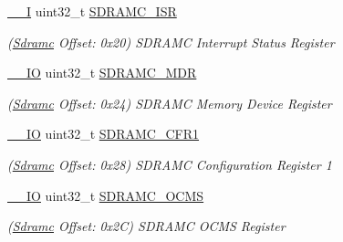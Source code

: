 \begin{DoxyCompactItemize}
\mbox{\label{structSdramc_a9ecf92e99d63d1d15fc8bf1386116e14}} 
\mbox{\hyperlink{core__cm7_8h_af63697ed9952cc71e1225efe205f6cd3}{\+\_\+\+\_\+I}} uint32\+\_\+t \mbox{\hyperlink{structSdramc_a9ecf92e99d63d1d15fc8bf1386116e14}{S\+D\+R\+A\+M\+C\+\_\+\+I\+SR}}
\begin{DoxyCompactList}\small\item\em (\mbox{\hyperlink{structSdramc}{Sdramc}} Offset\+: 0x20) S\+D\+R\+A\+MC Interrupt Status Register \end{DoxyCompactList}\item 
\mbox{\label{structSdramc_a87688d89689397e2bdbec196177c08c9}} 
\mbox{\hyperlink{core__cm7_8h_aec43007d9998a0a0e01faede4133d6be}{\+\_\+\+\_\+\+IO}} uint32\+\_\+t \mbox{\hyperlink{structSdramc_a87688d89689397e2bdbec196177c08c9}{S\+D\+R\+A\+M\+C\+\_\+\+M\+DR}}
\begin{DoxyCompactList}\small\item\em (\mbox{\hyperlink{structSdramc}{Sdramc}} Offset\+: 0x24) S\+D\+R\+A\+MC Memory Device Register \end{DoxyCompactList}\item 
\mbox{\label{structSdramc_ab4d0e677ef10512e2799b01c07c2c40e}} 
\mbox{\hyperlink{core__cm7_8h_aec43007d9998a0a0e01faede4133d6be}{\+\_\+\+\_\+\+IO}} uint32\+\_\+t \mbox{\hyperlink{structSdramc_ab4d0e677ef10512e2799b01c07c2c40e}{S\+D\+R\+A\+M\+C\+\_\+\+C\+F\+R1}}
\begin{DoxyCompactList}\small\item\em (\mbox{\hyperlink{structSdramc}{Sdramc}} Offset\+: 0x28) S\+D\+R\+A\+MC Configuration Register 1 \end{DoxyCompactList}\item 
\mbox{\label{structSdramc_a962d50372bb8acc1d7038967d1611e92}} 
\mbox{\hyperlink{core__cm7_8h_aec43007d9998a0a0e01faede4133d6be}{\+\_\+\+\_\+\+IO}} uint32\+\_\+t \mbox{\hyperlink{structSdramc_a962d50372bb8acc1d7038967d1611e92}{S\+D\+R\+A\+M\+C\+\_\+\+O\+C\+MS}}
\begin{DoxyCompactList}\small\item\em (\mbox{\hyperlink{structSdramc}{Sdramc}} Offset\+: 0x2C) S\+D\+R\+A\+MC O\+C\+MS Register \end{DoxyCompactList}\item 
\mbox{\label{structSdramc_a70166aa64c94c302923d050f0dc5bbbe}} 

\end{DoxyCompactItemize}

